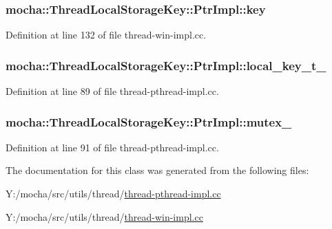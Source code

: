 \hypertarget{classmocha_1_1_thread_local_storage_key_1_1_ptr_impl_a4a6a60f8cda2417a27b435e7182980a6}{
\subsubsection[{key}]{ {\bf mocha::ThreadLocalStorageKey::PtrImpl::key}}}
\label{classmocha_1_1_thread_local_storage_key_1_1_ptr_impl_a4a6a60f8cda2417a27b435e7182980a6}


Definition at line 132 of file thread-\/win-\/impl.cc.

\hypertarget{classmocha_1_1_thread_local_storage_key_1_1_ptr_impl_af28bafd9e0a855ddf6e47659545af3f5}{
\subsubsection[{local\_\-key\_\-t\_\-}]{ {\bf mocha::ThreadLocalStorageKey::PtrImpl::local\_\-key\_\-t\_\-}}}
\label{classmocha_1_1_thread_local_storage_key_1_1_ptr_impl_af28bafd9e0a855ddf6e47659545af3f5}


Definition at line 89 of file thread-\/pthread-\/impl.cc.

\hypertarget{classmocha_1_1_thread_local_storage_key_1_1_ptr_impl_af64ffb2cd71d9810a21bb70c7366677b}{
\subsubsection[{mutex\_\-}]{ {\bf mocha::ThreadLocalStorageKey::PtrImpl::mutex\_\-}}}
\label{classmocha_1_1_thread_local_storage_key_1_1_ptr_impl_af64ffb2cd71d9810a21bb70c7366677b}


Definition at line 91 of file thread-\/pthread-\/impl.cc.



The documentation for this class was generated from the following files:\begin{DoxyCompactItemize}
\item 
Y:/mocha/src/utils/thread/\hyperlink{thread-pthread-impl_8cc}{thread-\/pthread-\/impl.cc}\item 
Y:/mocha/src/utils/thread/\hyperlink{thread-win-impl_8cc}{thread-\/win-\/impl.cc}\end{DoxyCompactItemize}
